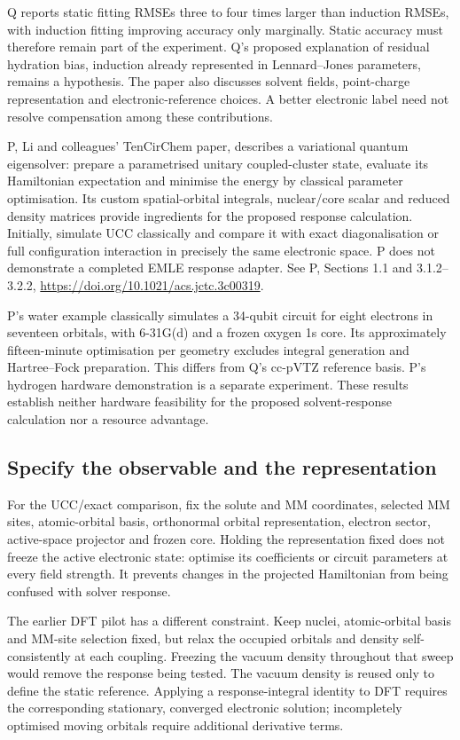 \documentclass{article}
\begin{document}
Q reports static fitting RMSEs three to four times larger than induction RMSEs, with induction fitting improving accuracy only marginally. Static accuracy must therefore remain part of the experiment. Q's proposed explanation of residual hydration bias, induction already represented in Lennard--Jones parameters, remains a hypothesis. The paper also discusses solvent fields, point-charge representation and electronic-reference choices. A better electronic label need not resolve compensation among these contributions.

P, Li and colleagues' TenCirChem paper, describes a variational quantum eigensolver: prepare a parametrised unitary coupled-cluster state, evaluate its Hamiltonian expectation and minimise the energy by classical parameter optimisation. Its custom spatial-orbital integrals, nuclear/core scalar and reduced density matrices provide ingredients for the proposed response calculation. Initially, simulate UCC classically and compare it with exact diagonalisation or full configuration interaction in precisely the same electronic space. P does not demonstrate a completed EMLE response adapter. See P, Sections 1.1 and 3.1.2--3.2.2, \url{https://doi.org/10.1021/acs.jctc.3c00319}.

P's water example classically simulates a 34-qubit circuit for eight electrons in seventeen orbitals, with 6-31G(d) and a frozen oxygen 1s core. Its approximately fifteen-minute optimisation per geometry excludes integral generation and Hartree--Fock preparation. This differs from Q's cc-pVTZ reference basis. P's hydrogen hardware demonstration is a separate experiment. These results establish neither hardware feasibility for the proposed solvent-response calculation nor a resource advantage.

\subsection{Specify the observable and the representation}

For the UCC/exact comparison, fix the solute and MM coordinates, selected MM sites, atomic-orbital basis, orthonormal orbital representation, electron sector, active-space projector and frozen core. Holding the representation fixed does not freeze the active electronic state: optimise its coefficients or circuit parameters at every field strength. It prevents changes in the projected Hamiltonian from being confused with solver response.

The earlier DFT pilot has a different constraint. Keep nuclei, atomic-orbital basis and MM-site selection fixed, but relax the occupied orbitals and density self-consistently at each coupling. Freezing the vacuum density throughout that sweep would remove the response being tested. The vacuum density is reused only to define the static reference. Applying a response-integral identity to DFT requires the corresponding stationary, converged electronic solution; incompletely optimised moving orbitals require additional derivative terms.
\end{document}
